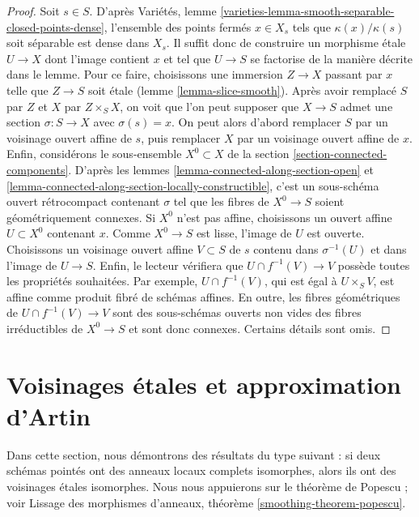 \begin{proof}
Soit $s \in S$. D'après
Variétés, lemme \ref{varieties-lemma-smooth-separable-closed-points-dense},
l'ensemble des points fermés $x \in X_s$ tels que $\kappa(x)/\kappa(s)$
soit séparable est dense dans $X_s$. Il suffit donc de construire un
morphisme \'etale $U \to X$ dont l'image contient $x$
et tel que $U \to S$ se factorise de la manière décrite dans le lemme.
Pour ce faire, choisissons une immersion $Z \to X$ passant par $x$
telle que $Z \to S$ soit \'etale (lemme \ref{lemma-slice-smooth}).
Après avoir remplacé $S$ par $Z$ et $X$ par $Z \times_S X$,
on voit que l'on peut supposer que $X \to S$ admet une section $\sigma : S \to X$
avec $\sigma(s) = x$. On peut alors d'abord remplacer $S$ par un voisinage
ouvert affine de $s$, puis remplacer $X$ par un voisinage ouvert affine
de $x$. Enfin, considérons le sous-ensemble
$X^0 \subset X$ de la section \ref{section-connected-components}.
D'après les lemmes \ref{lemma-connected-along-section-open} et
\ref{lemma-connected-along-section-locally-constructible},
c'est un sous-schéma ouvert rétrocompact contenant $\sigma$
tel que les fibres de $X^0 \to S$ soient géométriquement connexes.
Si $X^0$ n'est pas affine, choisissons un ouvert affine $U \subset X^0$
contenant $x$. Comme $X^0 \to S$ est lisse, l'image de $U$
est ouverte. Choisissons un voisinage ouvert affine $V \subset S$ de $s$
contenu dans $\sigma^{-1}(U)$ et dans l'image de $U \to S$.
Enfin, le lecteur vérifiera que $U \cap f^{-1}(V) \to V$
possède toutes les propriétés souhaitées. Par exemple, $U \cap f^{-1}(V)$,
qui est égal à $U \times_S V$, est affine comme produit fibré de schémas
affines. En outre, les fibres géométriques de $U \cap f^{-1}(V) \to V$ sont des
sous-schémas ouverts non vides des fibres irréductibles de $X^0 \to S$
et sont donc connexes. Certains détails sont omis.
\end{proof}











\section{Voisinages \'etales et approximation d'Artin}
\label{section-etale-nbhds-artin}

\noindent
Dans cette section, nous démontrons des résultats du type suivant : si deux
schémas pointés ont des anneaux locaux complets isomorphes, alors
ils ont des voisinages \'etales isomorphes. Nous nous appuierons
sur le théorème de Popescu ; voir
Lissage des morphismes d'anneaux, théorème \ref{smoothing-theorem-popescu}.

